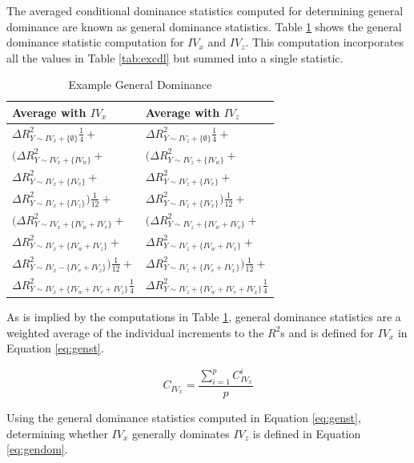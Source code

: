 \documentclass[ShortAfour,times,sageapa]{sagej}
\begin{document}
	The averaged conditional dominance statistics computed for determining general dominance are known as general dominance statistics. 
	Table \ref{tab:exgen} shows the general dominance statistic computation for $IV_x$ and $IV_z$.
	This computation incorporates all the values in Table \ref{tab:excdl} but summed into a single statistic.
	
		\begin{table}[h!]
		\centering
		\caption{\centering Example General Dominance}
		\begin{tabular}{ l l }
			Average with $IV_x$ & Average with $IV_z$ \\
			\hline
			$\Delta R^2_{Y \sim IV_x + \{\emptyset\}}\frac{1}{4} + $ & $\Delta R^2_{Y \sim IV_z + \{\emptyset\}}\frac{1}{4} +$ \\
			$(\Delta R^2_{Y \sim IV_x + \{IV_w\}} + $ & $(\Delta R^2_{Y \sim IV_z + \{IV_w\}} + $ \\
			$\Delta R^2_{Y \sim IV_x + \{IV_v\}} + $ & $\Delta R^2_{Y \sim IV_z + \{IV_v\}} + $ \\
			$\Delta R^2_{Y \sim IV_x + \{IV_z\}})\frac{1}{12} + $ & $\Delta R^2_{Y \sim IV_z + \{IV_x\}})\frac{1}{12} + $ \\
			$(\Delta R^2_{Y \sim IV_x + \{IV_w + IV_v\}} + $ & $(\Delta R^2_{Y \sim IV_z + \{IV_w + IV_v\}} + $ \\
			$\Delta R^2_{Y \sim IV_x + \{IV_w + IV_z\}} + $ & $\Delta R^2_{Y \sim IV_z + \{IV_w + IV_x\}} + $ \\
			$\Delta R^2_{Y \sim IV_x - \{IV_v + IV_z\}})\frac{1}{12} + $ & $\Delta R^2_{Y \sim IV_z + \{IV_v + IV_x\}})\frac{1}{12} +$ \\
			$\Delta R^2_{Y \sim IV_x + \{IV_w + IV_v + IV_z\}}\frac{1}{4}$ & $\Delta R^2_{Y \sim IV_z + \{IV_w + IV_v + IV_x\}}\frac{1}{4}$ \\
			\hline
		\end{tabular}
		\label{tab:exgen}
	\end{table}

	As is implied by the computations in Table \ref{tab:exgen}, general dominance statistics are a weighted average of the individual increments to the $R^2$s and is defined for $IV_x$ in Equation \ref{eq:genst}.
	
	\begin{equation}
		C_{IV_x} = \frac{\sum^{p}_{i=1} C^i_{IV_x}}{p}
		\label{eq:genst}
	\end{equation}
	
	Using the general dominance statistics computed in Equation \ref{eq:genst}, determining whether $IV_x$ generally dominates $IV_z$ is defined in Equation \ref{eq:gendom}.
	
\end{document}
